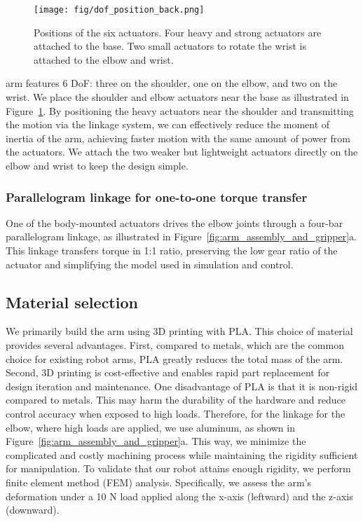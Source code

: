\begin{figure}[hbt]
    \centering
    \texttt{[image: fig/dof\_position\_back.png]}
    \caption{Positions of the six actuators. Four heavy and strong actuators are attached to the base. Two small actuators to rotate the wrist is attached to the elbow and wrist.}
    \label{fig:dof_position_back}
\end{figure}

\robot arm features 6 DoF: three on the shoulder, one on the elbow, and two on the wrist. We place the shoulder and elbow actuators near the base as illustrated in Figure~\ref{fig:dof_position_back}. By positioning the heavy actuators near the shoulder and transmitting the motion via the linkage system, we can effectively reduce the moment of inertia of the arm, achieving faster motion with the same amount of power from the actuators. We attach the two weaker but lightweight actuators directly on the elbow and wrist to keep the design simple.

\subsubsection{Parallelogram linkage for one-to-one torque transfer}
\label{sec:linkage}

One of the body-mounted actuators drives the elbow joints through a four-bar parallelogram linkage, as illustrated in Figure~\ref{fig:arm_assembly_and_gripper}a. This linkage transfers torque in 1:1 ratio, preserving the low gear ratio of the actuator and simplifying the model used in simulation and control.


\subsection{Material selection}
We primarily build the arm using 3D printing with PLA. This choice of material provides several advantages. First, compared to metals, which are the common choice for existing robot arms, PLA greatly reduces the total mass of the arm. Second, 3D printing is cost-effective and enables rapid part replacement for design iteration and maintenance. One disadvantage of PLA is that it is non-rigid compared to metals. This may harm the durability of the hardware and reduce control accuracy when exposed to high loads. Therefore, for the linkage for the elbow, where high loads are applied, we use aluminum, as shown in Figure~\ref{fig:arm_assembly_and_gripper}a. This way, we minimize the complicated and costly machining process while maintaining the rigidity sufficient for manipulation. To validate that our robot attains enough rigidity, we perform finite element method (FEM) analysis. Specifically, we assess the arm's deformation under a 10 N load applied along the x-axis (leftward) and the z-axis (downward).

